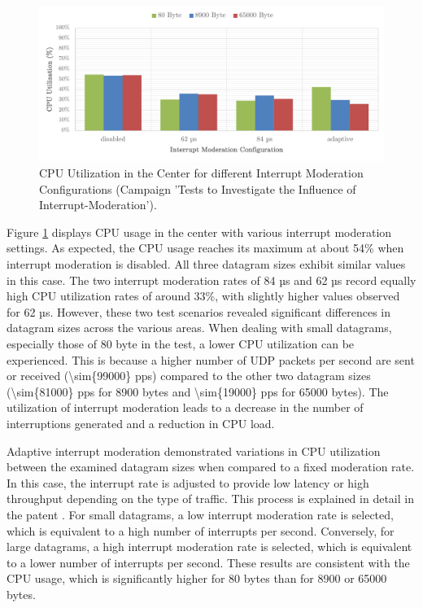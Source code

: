 \begin{figure}[h]
    \centering
    \includegraphics[width=1\linewidth]{figures/reliability/ihawk/diagr11.pdf}
    \caption{CPU Utilization in the Center for different Interrupt Moderation Configurations (Campaign 'Tests to Investigate the Influence of Interrupt-Moderation').}
    \label{fig:diagr11CPU}
\end{figure}

Figure \ref{fig:diagr11CPU} displays CPU usage in the center with various interrupt moderation settings. As expected, the CPU usage reaches its maximum at about 54\% when interrupt moderation is disabled. All three datagram sizes exhibit similar values in this case. The two interrupt moderation rates of 84 µs and 62 µs record equally high CPU utilization rates of around 33\%, with slightly higher values observed for 62 µs. However, these two test scenarios revealed significant differences in datagram sizes across the various areas. When dealing with small datagrams, especially those of 80 byte in the test, a lower CPU utilization can be experienced. This is because a higher number of UDP packets per second are sent or received (\num{\sim{99000}} pps) compared to the other two datagram sizes (\num{\sim{81000}} pps for 8900 bytes and \num{\sim{19000}} pps for 65000 bytes). The utilization of interrupt moderation leads to a decrease in the number of interruptions generated and a reduction in CPU load.

Adaptive interrupt moderation demonstrated variations in CPU utilization between the examined datagram sizes when compared to a fixed moderation rate. In this case, the interrupt rate is adjusted to provide low latency or high throughput depending on the type of traffic. This process is explained in detail in the patent \cite{intermod04}. For small datagrams, a low interrupt moderation rate is selected, which is equivalent to a high number of interrupts per second. Conversely, for large datagrams, a high interrupt moderation rate is selected, which is equivalent to a lower number of interrupts per second. These results are consistent with the CPU usage, which is significantly higher for 80 bytes than for 8900 or 65000 bytes.

